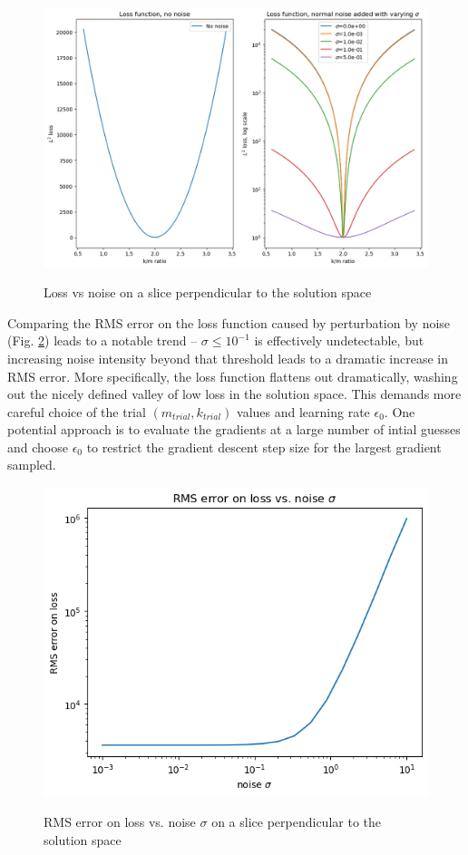 \documentclass[]{article}
\begin{document}
\begin{figure}[H]
	\caption{Loss vs noise on a slice perpendicular to the solution space}
	\centering
	\includegraphics[scale=0.40]{loss-vs-noise.png}
	\label{fig:loss-vs-noise}
\end{figure}

Comparing the RMS error on the loss function caused by perturbation by noise (Fig. \ref{fig:rms-error-vs-sigma}) leads to a notable trend -- $\sigma\leq10^{-1}$ is effectively undetectable, but increasing noise intensity beyond that threshold leads to a dramatic increase in RMS error. More specifically, the loss function flattens out dramatically, washing out the nicely defined valley of low loss in the solution space. This demands more careful choice of the trial $(m_{trial},k_{trial})$ values and learning rate $\epsilon_0$. One potential approach is to evaluate the gradients at a large number of intial guesses and choose $\epsilon_0$ to restrict the gradient descent step size for the largest gradient sampled.



\begin{figure}[H]
	\caption{RMS error on loss vs. noise $\sigma$ on a slice perpendicular to the solution space}
	\centering
	\includegraphics[scale=0.60]{rms-error-vs-sigma.png}
	\label{fig:rms-error-vs-sigma}
\end{figure}
\end{document}
